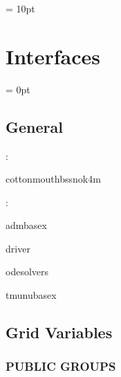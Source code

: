 \documentclass{article}
\begin{document}
\vspace{0.5cm}\parskip = 10pt 

\section{Interfaces} 


\parskip = 0pt

\vspace{3mm} \subsection*{General}

: 

cottonmouthbssnok4m
\vspace{2mm}

: 

admbasex

driver

odesolvers

tmunubasex
\vspace{2mm}
\subsection*{Grid Variables}
\vspace{5mm}\subsubsection{PUBLIC GROUPS}

\vspace{5mm}
\end{document}
